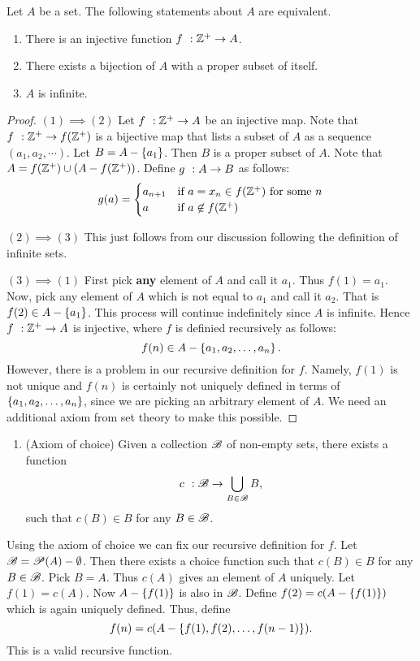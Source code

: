 \begin{Theorem}
    Let $A$ be a set. The following statements about $A$ are equivalent.
    \begin{enumerate}
	\item
	    There is an injective function ${f}\hspace{0.05in}:{\mathbb{Z}^{+}}\to{A}$.
	\item
	    There exists a bijection of $A$ with a proper subset of itself.
	\item
	    $A$ is infinite.
    \end{enumerate}
\end{Theorem}
\begin{proof}
    $(1)\implies(2)$
    Let ${f}\hspace{0.05in}:{\mathbb{Z}^{+}}\to{A}$ be an injective map. Note that ${f}\hspace{0.05in}:{\mathbb{Z}^{+}}\to{f(\mathbb{Z}^{+})}$ is a bijective map
    that lists a subset of $A$ as a sequence $(a_1,a_2,\cdots)$. Let $B = A - \left\lbrace{a_1}\right\rbrace$. Then $B$ is a
    proper subset of $A$. Note that $A = f(\mathbb{Z}^{+})\cup ({A}-{f(\mathbb{Z}^{+})})$. 
    Define ${g}\hspace{0.05in}:{A}\to{B}$ as follows:
    \begin{equation*}
	g(a) = 
	\begin{cases}
	    a_{n+1}&\text{if $a = x_n \in f(\mathbb{Z}^{+})$ for some $n$}\\
	    a &\text{if $a \not\in f(\mathbb{Z}^{+})$}
	\end{cases}
    \end{equation*}

    $(2)\implies(3)$ This just follows from our discussion following the definition of infinite sets.

    $(3)\implies(1)$
    First pick \textbf{any} element of $A$ and call it $a_1$. Thus $f(1) = a_1$. Now, pick any element of $A$
    which is not equal to $a_1$ and call it $a_2$. That is $f(2) \in A - \left\lbrace{a_1}\right\rbrace$. This process will
    continue indefinitely since $A$ is infinite. Hence ${f}\hspace{0.05in}:{\mathbb{Z}^{+}}\to{A}$ is injective, where $f$ is
    definied recursively as follows:
    \[f(n) \in A - \left\lbrace{a_1,a_2,\ldots,a_n}\right\rbrace.\]
    However, there is a problem in our recursive definition for $f$. Namely, $f(1)$ is not unique and $f(n)$
    is certainly not uniquely defined in terms of $\left\lbrace{a_1,a_2,\ldots,a_n}\right\rbrace$, since we are picking an
    arbitrary element of $A$. We need an additional axiom from set theory to make this possible.
\end{proof}


\begin{enumerate}[label=\bfseries Axiom 11:]
    \item (Axiom of choice) Given a collection $\mathscr{B}$ of non-empty sets, there exists a function 
	\[{c}\hspace{0.05in}:{\mathscr{B}}\to{\bigcup\limits_{B\in\mathscr{B}}B},\]
	such that $c(B)\in B$ for any $B \in \mathscr{B}$.
\end{enumerate}
Using the axiom of choice we can fix our recursive definition for $f$. 
Let $\mathscr{B} = \mathscr{P}{\left({A}\right)}-\emptyset$. Then there exists a choice function such that $c(B) \in B$ for any $B \in
\mathscr{B}$. Pick $B = A$. Thus $c(A)$ gives an element of $A$ uniquely.
Let $f(1) = c(A)$.
Now $A - \left\lbrace{f(1)}\right\rbrace$ is also in $\mathscr{B}$. Define $f(2) = c(A - \left\lbrace{f(1)}\right\rbrace)$ which is again uniquely defined.
Thus, define
\[f(n) = c(A - \left\lbrace{f(1),f(2),\ldots,f(n-1)}\right\rbrace).\]
This is a valid recursive function.


